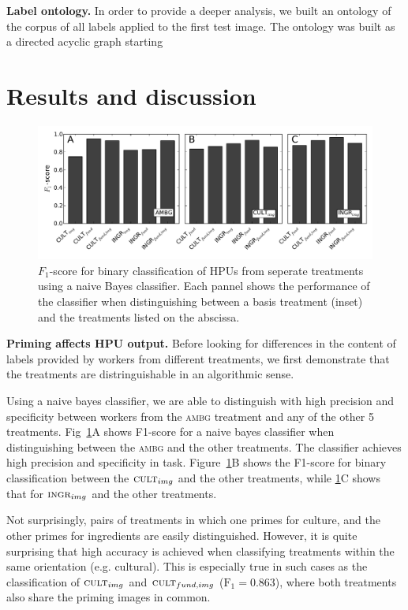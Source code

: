 \documentclass[letterpaper, 11pt, twocolumn]{article}
\begin{document}
\textbf{Label ontology.}
In order to provide a deeper analysis, we built an ontology
of the corpus of all labels applied to the first test image.  The ontology
was built as a directed acyclic graph starting 

\section*{Results and discussion}

\begin{figure}
	\begin{center}
		\includegraphics[scale=0.55]{../figs/f1scores.pdf}
		\caption{$F_1$-score for binary classification of HPUs from seperate
			treatments using a naive Bayes classifier.  Each pannel shows
			the performance of the classifier when distinguishing between 
			a basis treatment (inset) and the treatments listed on the 
			abscissa.
		}
		\label{fig:classifier}
	\end{center}
\end{figure}

\textbf{Priming affects HPU output.}
Before looking for differences in the content of labels provided by workers
from different treatments, we first demonstrate that the treatments are
distringuishable in an algorithmic sense.

Using a naive bayes classifier, we are able to distinguish with high precision
and specificity between workers from the \textsc{ambg} treatment and any of
the other 5 treatments.  Fig~\ref{fig:classifier}A shows F1-score for a
naive bayes classifier when distinguishing between the \textsc{ambg} and 
the other treatments. The classifier achieves high precision and specificity
in task.  Figure~\ref{fig:classifier}B shows the F1-score for binary
classification between the $\textsc{cult}_{img}$ and the other treatments, 
while \ref{fig:classifier}C shows that for $\textsc{ingr}_{img}$ and the other
treatments.  

Not surprisingly, pairs of treatments in which one primes for culture, and the
other primes for ingredients are easily distinguished.  However, it is quite
surprising that high accuracy is achieved when classifying treatments within 
the same orientation (e.g. cultural).  This is especially true in such cases as
the classification of  $\textsc{cult}_{img}$ and $\textsc{cult}_{fund,img}$
($\text{F}_1 = 0.863$), where both treatments also share the priming images in 
common.
\end{document}
